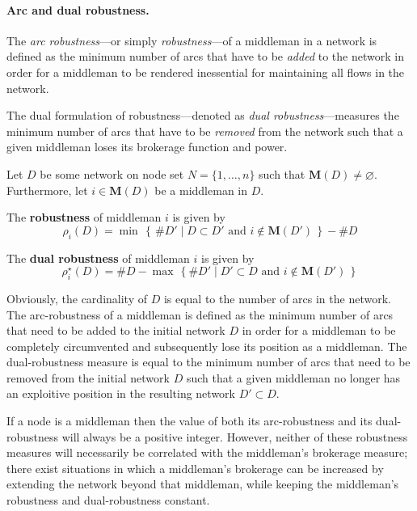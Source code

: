 \paragraph{Arc and dual robustness.}

The \emph{arc robustness}---or simply \emph{robustness}---of a middleman in a network is defined as the minimum number of arcs that have to be \emph{added} to the network in order for a middleman to be rendered inessential for maintaining all flows in the network.

The dual formulation of robustness---denoted as  \emph{dual robustness}---measures the minimum number of arcs that have to be \emph{removed} from the network such that a given middleman loses its brokerage function and power.

\begin{definition} \label{robustness}
Let $D$ be some network on node set $N = \{1,\ldots,n\}$ such that $\mathbf{M}(D) \neq \varnothing$. Furthermore, let $i \in \mathbf{M}(D)$ be a middleman in $D$.
\begin{abet}
	\item The \textbf{robustness} of middleman $i$ is given by
	\begin{equation}
		\rho_{i} (D) = \min \, \left\{ \, \# D' \mid D \subset D' \mbox{ and } i \notin \mathbf{M}(D') \, \right\} - \# D
	\end{equation}
	
	\item The \textbf{dual robustness} of middleman $i$ is given by
	\begin{equation}
		\rho_{i}^{\star} (D) = \# D - \max \, \left\{ \# D' \mid D' \subset D \mbox{ and } i \notin \mathbf{M}(D') \, \right\}
	\end{equation}
\end{abet}
\end{definition}

\noindent
Obviously, the cardinality of $D$ is equal to the number of arcs in the network. The arc-robustness of a middleman is defined as the minimum number of arcs that need to be added to the initial network $D$ in order for a middleman to be completely circumvented and subsequently lose its position as a middleman. The dual-robustness measure is equal to the minimum number of arcs that need to be removed from the initial network $D$ such that a given middleman no longer has an exploitive position in the resulting network $D' \subset D$.

If a node is a middleman then the value of both its arc-robustness and its dual-robustness will always be a positive integer. However, neither of these robustness measures will necessarily be correlated with the middleman's brokerage measure; there exist situations in which a middleman's brokerage can be increased by extending the network beyond that middleman, while keeping the middleman's robustness and dual-robustness constant.

